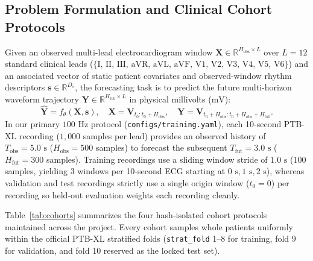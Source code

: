 \documentclass[11pt,a4paper]{article}
\begin{document}
\subsection{Problem Formulation and Clinical Cohort Protocols}
Given an observed multi-lead electrocardiogram window $\mathbf{X} \in \mathbb{R}^{H_{\text{obs}} \times L}$ over $L = 12$ standard clinical leads ($\{\text{I, II, III, aVR, aVL, aVF, V1, V2, V3, V4, V5, V6}\}$) and an associated vector of static patient covariates and observed-window rhythm descriptors $\mathbf{s} \in \mathbb{R}^{D_s}$, the forecasting task is to predict the future multi-horizon waveform trajectory $\mathbf{Y} \in \mathbb{R}^{H_{\text{fut}} \times L}$ in physical millivolts ($\text{mV}$):
\begin{equation}
    \hat{\mathbf{Y}} = f_{\theta}(\mathbf{X}, \mathbf{s}), \quad \mathbf{X} = \mathbf{V}_{t_0 : t_0 + H_{\text{obs}}}, \quad \mathbf{Y} = \mathbf{V}_{t_0 + H_{\text{obs}} : t_0 + H_{\text{obs}} + H_{\text{fut}}}.
\end{equation}
In our primary $100\text{ Hz}$ protocol (\texttt{configs/training.yaml}), each 10-second PTB-XL recording ($1{,}000$ samples per lead) provides an observed history of $T_{\text{obs}} = 5.0\text{ s}$ ($H_{\text{obs}} = 500$ samples) to forecast the subsequent $T_{\text{fut}} = 3.0\text{ s}$ ($H_{\text{fut}} = 300$ samples). Training recordings use a sliding window stride of $1.0\text{ s}$ ($100$ samples, yielding $3$ windows per 10-second ECG starting at $0\text{ s}, 1\text{ s}, 2\text{ s}$), whereas validation and test recordings strictly use a single origin window ($t_0 = 0$) per recording so held-out evaluation weights each recording cleanly.

Table~\ref{tab:cohorts} summarizes the four hash-isolated cohort protocols maintained across the project. Every cohort samples whole patients uniformly within the official PTB-XL stratified folds (\texttt{strat\_fold} 1--8 for training, fold 9 for validation, and fold 10 reserved as the locked test set).
\end{document}
